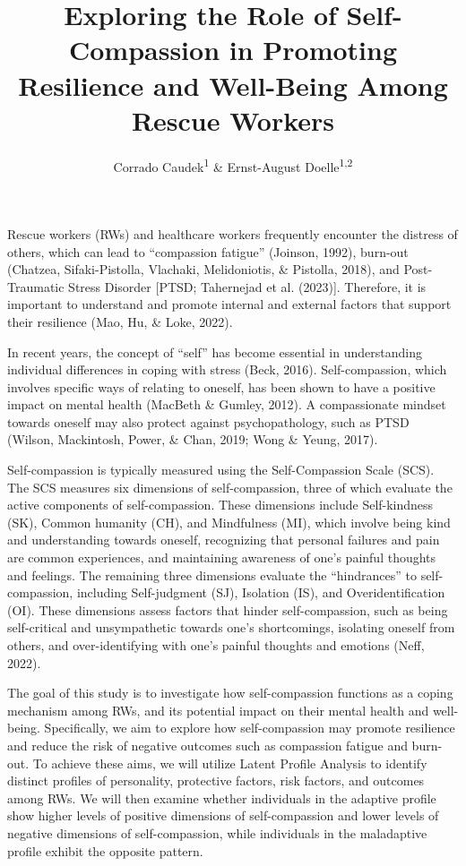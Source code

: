\documentclass[
  man]{apa6}
\title{Exploring the Role of Self-Compassion in Promoting Resilience and Well-Being Among Rescue Workers}
\author{Corrado Caudek\textsuperscript{1} \& Ernst-August Doelle\textsuperscript{1,2}}
\date{}
\affiliation{\vspace{0.5cm}\textsuperscript{1} Wilhelm-Wundt-University\\\textsuperscript{2} Konstanz Business School}
\begin{document}
\maketitle

Rescue workers (RWs) and healthcare workers frequently encounter the distress of others, which can lead to ``compassion fatigue'' (Joinson, 1992), burn-out (Chatzea, Sifaki-Pistolla, Vlachaki, Melidoniotis, \& Pistolla, 2018), and Post-Traumatic Stress Disorder {[}PTSD; Tahernejad et al. (2023){]}. Therefore, it is important to understand and promote internal and external factors that support their resilience (Mao, Hu, \& Loke, 2022).

In recent years, the concept of ``self'' has become essential in understanding individual differences in coping with stress (Beck, 2016). Self-compassion, which involves specific ways of relating to oneself, has been shown to have a positive impact on mental health (MacBeth \& Gumley, 2012). A compassionate mindset towards oneself may also protect against psychopathology, such as PTSD (Wilson, Mackintosh, Power, \& Chan, 2019; Wong \& Yeung, 2017).

Self-compassion is typically measured using the Self-Compassion Scale (SCS). The SCS measures six dimensions of self-compassion, three of which evaluate the active components of self-compassion. These dimensions include Self-kindness (SK), Common humanity (CH), and Mindfulness (MI), which involve being kind and understanding towards oneself, recognizing that personal failures and pain are common experiences, and maintaining awareness of one's painful thoughts and feelings. The remaining three dimensions evaluate the ``hindrances'' to self-compassion, including Self-judgment (SJ), Isolation (IS), and Overidentification (OI). These dimensions assess factors that hinder self-compassion, such as being self-critical and unsympathetic towards one's shortcomings, isolating oneself from others, and over-identifying with one's painful thoughts and emotions (Neff, 2022).

The goal of this study is to investigate how self-compassion functions as a coping mechanism among RWs, and its potential impact on their mental health and well-being. Specifically, we aim to explore how self-compassion may promote resilience and reduce the risk of negative outcomes such as compassion fatigue and burn-out. To achieve these aims, we will utilize Latent Profile Analysis to identify distinct profiles of personality, protective factors, risk factors, and outcomes among RWs. We will then examine whether individuals in the adaptive profile show higher levels of positive dimensions of self-compassion and lower levels of negative dimensions of self-compassion, while individuals in the maladaptive profile exhibit the opposite pattern.
\end{document}
